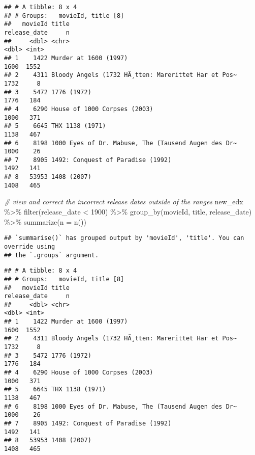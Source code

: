 \documentclass[
]{article}
\newenvironment{Shaded}{\begin{snugshade}}{\end{snugshade}}
\newcommand{\AttributeTok}[1]{\textcolor[rgb]{0.77,0.63,0.00}{#1}}
\newcommand{\CommentTok}[1]{\textcolor[rgb]{0.56,0.35,0.01}{\textit{#1}}}
\newcommand{\DecValTok}[1]{\textcolor[rgb]{0.00,0.00,0.81}{#1}}
\newcommand{\FunctionTok}[1]{\textcolor[rgb]{0.00,0.00,0.00}{#1}}
\newcommand{\NormalTok}[1]{#1}
\newcommand{\SpecialCharTok}[1]{\textcolor[rgb]{0.00,0.00,0.00}{#1}}
\begin{document}
\begin{verbatim}
## # A tibble: 8 x 4
## # Groups:   movieId, title [8]
##   movieId title                                               release_date     n
##     <dbl> <chr>                                                      <dbl> <int>
## 1    1422 Murder at 1600 (1997)                                       1600  1552
## 2    4311 Bloody Angels (1732 HÃ¸tten: Marerittet Har et Pos~         1732     8
## 3    5472 1776 (1972)                                                 1776   184
## 4    6290 House of 1000 Corpses (2003)                                1000   371
## 5    6645 THX 1138 (1971)                                             1138   467
## 6    8198 1000 Eyes of Dr. Mabuse, The (Tausend Augen des Dr~         1000    26
## 7    8905 1492: Conquest of Paradise (1992)                           1492   141
## 8   53953 1408 (2007)                                                 1408   465
\end{verbatim}

\begin{Shaded}
\begin{Highlighting}[]
\CommentTok{\# view and correct the incorrect release dates outside of the ranges}
\NormalTok{new\_edx }\SpecialCharTok{\%\textgreater{}\%} \FunctionTok{filter}\NormalTok{(release\_date }\SpecialCharTok{\textless{}} \DecValTok{1900}\NormalTok{) }\SpecialCharTok{\%\textgreater{}\%} \FunctionTok{group\_by}\NormalTok{(movieId, title, release\_date) }\SpecialCharTok{\%\textgreater{}\%} \FunctionTok{summarize}\NormalTok{(}\AttributeTok{n =} \FunctionTok{n}\NormalTok{())}
\end{Highlighting}
\end{Shaded}

\begin{verbatim}
## `summarise()` has grouped output by 'movieId', 'title'. You can override using
## the `.groups` argument.
\end{verbatim}

\begin{verbatim}
## # A tibble: 8 x 4
## # Groups:   movieId, title [8]
##   movieId title                                               release_date     n
##     <dbl> <chr>                                                      <dbl> <int>
## 1    1422 Murder at 1600 (1997)                                       1600  1552
## 2    4311 Bloody Angels (1732 HÃ¸tten: Marerittet Har et Pos~         1732     8
## 3    5472 1776 (1972)                                                 1776   184
## 4    6290 House of 1000 Corpses (2003)                                1000   371
## 5    6645 THX 1138 (1971)                                             1138   467
## 6    8198 1000 Eyes of Dr. Mabuse, The (Tausend Augen des Dr~         1000    26
## 7    8905 1492: Conquest of Paradise (1992)                           1492   141
## 8   53953 1408 (2007)                                                 1408   465
\end{verbatim}
\end{document}

